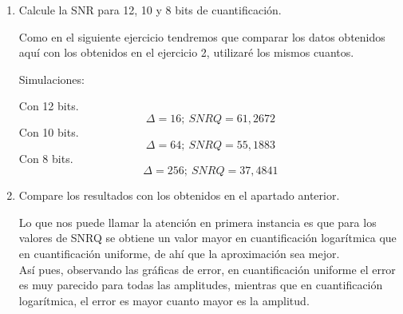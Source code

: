 \documentclass[a4paper,12pt]{article}
\begin{document}
\begin{enumerate}
\item Calcule la SNR para 12, 10 y 8 bits de cuantificación.

Como en el siguiente ejercicio tendremos que comparar los datos obtenidos aquí con los obtenidos en el ejercicio 2, utilizaré los mismos cuantos.

Simulaciones:

Con 12 bits.
$$ \Delta = 16;\ SNRQ = 61,2672 $$
Con 10 bits.
$$ \Delta = 64;\ SNRQ = 55,1883 $$
Con 8 bits.
$$ \Delta = 256;\ SNRQ = 37,4841 $$

\item Compare los resultados con los obtenidos en el apartado anterior.

Lo que nos puede llamar la atención en primera instancia es que para los valores de SNRQ se obtiene un valor mayor en cuantificación logarítmica que en cuantificación uniforme, de ahí que la aproximación sea mejor. \\

Así pues, observando las gráficas de error, en cuantificación uniforme el error es muy parecido para todas las amplitudes, mientras que en cuantificación logarítmica, el error es mayor cuanto mayor es la amplitud.
\end{enumerate}
\end{document}
